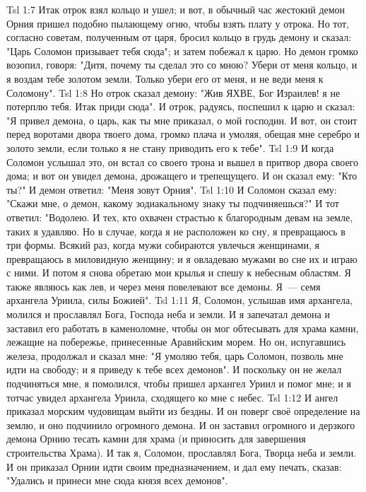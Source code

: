\vs Tsl 1:7 
Итак отрок взял кольцо и ушел; и вот, в обычный час жестокий демон Орния пришел подобно пылающему огню, чтобы взять плату у отрока. Но тот, согласно советам, полученным от царя, бросил кольцо в грудь демону и сказал: "Царь Соломон призывает тебя сюда"; и затем побежал к царю. Но демон громко возопил, говоря: "Дитя, почему ты сделал это со мною? Убери от меня кольцо, и я воздам тебе золотом земли. Только убери его от меня, и не веди меня к Соломону".
\vs Tsl 1:8 
Но отрок сказал демону: "Жив ЯХВЕ, Бог Израилев! я не потерплю тебя. Итак приди сюда". И отрок, радуясь, поспешил к царю и сказал: "Я привел демона, о царь, как ты мне приказал, о мой господин. И вот, он стоит перед воротами двора твоего дома, громко плача и умоляя, обещая мне серебро и золото земли, если только я не стану приводить его к тебе".
\vs Tsl 1:9 
И когда Соломон услышал это, он встал со своего трона и вышел в притвор двора своего дома; и вот он увидел демона, дрожащего и трепещущего. И он сказал ему: "Кто ты?" И демон ответил: "Меня зовут Орния".
\vs Tsl 1:10 
И Соломон сказал ему: "Скажи мне, о демон, какому зодиакальному знаку ты подчиняешься?" И тот ответил: "Водолею. И тех, кто охвачен страстью к благородным девам на земле, таких я удавляю. Но в случае, когда я не расположен ко сну, я превращаюсь в три формы. Всякий раз, когда мужи собираются увлечься женщинами, я превращаюсь в миловидную женщину; и я овладеваю мужами во сне их и играю с ними. И потом я снова обретаю мои крылья и спешу к небесным областям. Я также являюсь как лев, и через меня повелевают все демоны. Я~--- семя архангела Уриила, силы Божией".
\vs Tsl 1:11 
Я, Соломон, услышав имя архангела, молился и прославлял Бога, Господа неба и земли. И я запечатал демона и заставил его работать в каменоломне, чтобы он мог обтесывать для храма камни, лежащие на побережье, принесенные Аравийским морем. Но он, испугавшись железа, продолжал и сказал мне: "Я умоляю тебя, царь Соломон, позволь мне идти на свободу; и я приведу к тебе всех демонов". И поскольку он не желал подчиняться мне, я помолился, чтобы пришел архангел Уриил и помог мне; и я тотчас увидел архангела Уриила, сходящего ко мне с небес.
\vs Tsl 1:12 
И ангел приказал морским чудовищам выйти из бездны. И он поверг своё определение на землю, и оно подчинило огромного демона. И он заставил огромного и дерзкого демона Орнию тесать камни для храма (и приносить для завершения строительства Храма). И так я, Соломон, прославлял Бога, Творца неба и земли. И он приказал Орнии идти своим предназначением, и дал ему печать, сказав: "Удались и принеси мне сюда князя всех демонов".
